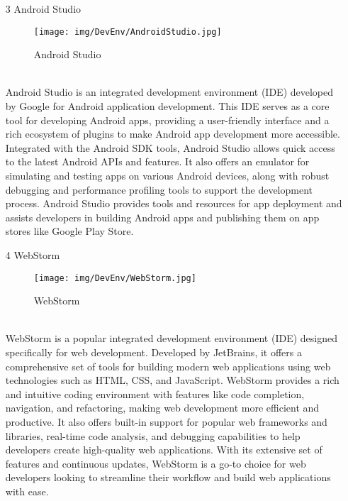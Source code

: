 \documentclass[conference]{IEEEtran}
\begin{document}
\begin{enumerate}
\item[3] Android Studio 
\begin{figure}[h]
\centering
\texttt{[image: img/DevEnv/AndroidStudio.jpg]}
\caption{Android Studio} 
\end{figure}\\
Android Studio is an integrated development environment (IDE) developed by Google for Android application development. This IDE serves as a core tool for developing Android apps, providing a user-friendly interface and a rich ecosystem of plugins to make Android app development more accessible. Integrated with the Android SDK tools, Android Studio allows quick access to the latest Android APIs and features. It also offers an emulator for simulating and testing apps on various Android devices, along with robust debugging and performance profiling tools to support the development process. Android Studio provides tools and resources for app deployment and assists developers in building Android apps and publishing them on app stores like Google Play Store.\\

\item[4] WebStorm
\begin{figure}[h]
\centering
\texttt{[image: img/DevEnv/WebStorm.jpg]}
\caption{WebStorm} 
\end{figure}\\
WebStorm is a popular integrated development environment (IDE) designed specifically for web development. Developed by JetBrains, it offers a comprehensive set of tools for building modern web applications using web technologies such as HTML, CSS, and JavaScript. WebStorm provides a rich and intuitive coding environment with features like code completion, navigation, and refactoring, making web development more efficient and productive. It also offers built-in support for popular web frameworks and libraries, real-time code analysis, and debugging capabilities to help developers create high-quality web applications. With its extensive set of features and continuous updates, WebStorm is a go-to choice for web developers looking to streamline their workflow and build web applications with ease.\\


\end{enumerate}
\end{document}
